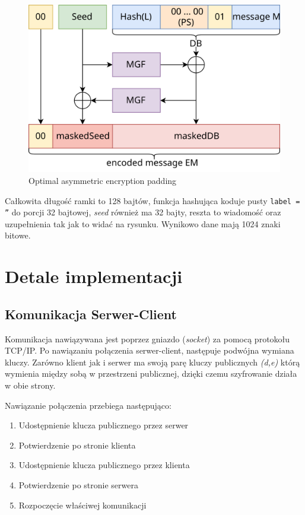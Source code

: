 \documentclass[a4paper,12pt]{article}
\begin{document}
\begin{figure}
\centerline{\includegraphics[scale=0.15]{OAEP.png}}
\caption{Optimal asymmetric encryption padding}
\end{figure}
Całkowita długość ramki to 128 bajtów, funkcja hashująca koduje
pusty \texttt{label = ''} do porcji 32 bajtowej, \textit{seed} również
ma 32 bajty, reszta to wiadomość oraz uzupełnienia tak jak to
widać na rysunku. Wynikowo dane mają 1024 znaki bitowe.

\newpage

\section{Detale implementacji}
\subsection{Komunikacja Serwer-Client}
Komunikacja nawiązywana jest poprzez gniazdo (\textit{socket}) za pomocą protokołu TCP/IP. Po nawiązaniu połączenia serwer-client, następuje podwójna wymiana kluczy. Zarówno klient jak i serwer ma swoją parę kluczy publicznych \textit{(d,e)} którą wymienia między sobą w przestrzeni publicznej, dzięki czemu szyfrowanie działa w obie strony.  

Nawiązanie połączenia przebiega następująco: 
\begin{enumerate}
	\item Udostępnienie klucza publicznego przez serwer
	\item Potwierdzenie po stronie klienta
	\item Udostępnienie klucza publicznego przez klienta
	\item Potwierdzenie po stronie serwera
	\item Rozpoczęcie właściwej komunikacji
\end{enumerate}
\end{document}
